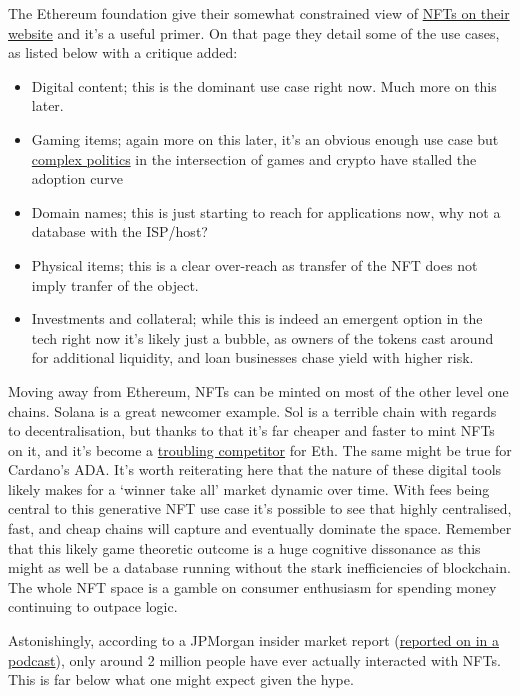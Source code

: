 The Ethereum foundation give their somewhat constrained view of \href{https://ethereum.org/en/nft/}{NFTs on their website} and it's a useful primer. On that page they detail some of the use cases, as listed below with a critique added:
\begin{itemize}
\item Digital content; this is the dominant use case right now. Much more on this later.
\item Gaming items; again more on this later, it's an obvious enough use case but \href{https://climatereplay.org/nfts/nft-digital-ownership-pledge/}{complex politics} in the intersection of games and crypto have stalled the adoption curve
\item Domain names; this is just starting to reach for applications now, why not a database with the ISP/host?
\item Physical items; this is a clear over-reach as transfer of the NFT does not imply tranfer of the object.
\item Investments and collateral; while this is indeed an emergent option in the tech right now it's likely just a bubble, as owners of the tokens cast around for additional liquidity, and loan businesses chase yield with higher risk.
\end{itemize}
Moving away from Ethereum, NFTs can be minted on most of the other level one chains. Solana is a great newcomer example. Sol is a terrible chain with regards to decentralisation, but thanks to that it's far cheaper and faster to mint NFTs on it, and it's become a \href{https://markets.businessinsider.com/news/currencies/ethereum-eth-killers-nfts-defi-solana-cardano-wax-crypto-investing-2022-1}{troubling competitor} for Eth. The same might be true for Cardano's ADA. It's worth reiterating here that the nature of these digital tools likely makes for a `winner take all' market dynamic over time. With fees being central to this generative NFT use case it's possible to see that highly centralised, fast, and cheap chains will capture and eventually dominate the space. Remember that this likely game theoretic outcome is a huge cognitive dissonance as this might as well be a database running without the stark inefficiencies of blockchain. The whole NFT space is a gamble on consumer enthusiasm for spending money continuing to outpace logic.\par 
Astonishingly, according to a JPMorgan insider market report (\href{https://www.coindesk.com/podcasts/the-breakdown-with-nlw/jpmorgan-bitcoin-shows-some-merit-as-a-store-of-value/}{reported on in a podcast}), only around 2 million people have ever actually interacted with NFTs. This is far below what one might expect given the hype.\par
